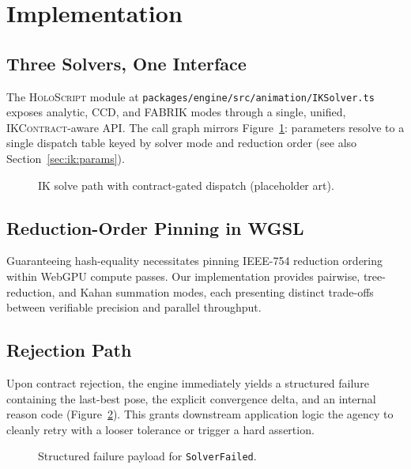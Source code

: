 \documentclass[sigconf,nonacm]{acmart}
\newcommand{\holoscript}{\textsc{HoloScript}}
\newcommand{\ikcontract}{\textsc{IKContract}}
\newcommand{\fabrik}{\textsc{FABRIK}}
\newcommand{\ccd}{\textsc{CCD}}
\begin{document}
\section{Implementation}
\label{sec:impl}

\subsection{Three Solvers, One Interface}
The \holoscript{} module at \texttt{packages/engine/src/animation/IKSolver.ts} exposes analytic, \ccd{}, and \fabrik{} modes through a single, unified, \ikcontract{}-aware API. The call graph mirrors
Figure~\ref{fig:ik-api}: parameters resolve to a single dispatch table keyed by
solver mode and reduction order (see also Section~\ref{sec:ik:params}).

\begin{figure}[t]
  \centering
  \caption{IK solve path with contract-gated dispatch (placeholder art).}
  \label{fig:ik-api}
\end{figure}

\subsection{Reduction-Order Pinning in WGSL}
Guaranteeing hash-equality necessitates pinning IEEE-754 reduction ordering within WebGPU compute passes. Our implementation provides pairwise, tree-reduction, and Kahan summation modes, each presenting distinct trade-offs between verifiable precision and parallel throughput.

\subsection{Rejection Path}
Upon contract rejection, the engine immediately yields a structured failure containing the last-best pose, the explicit convergence delta, and an internal reason code (Figure~\ref{fig:reject}). This grants downstream application logic the agency to cleanly retry with a looser tolerance or trigger a hard assertion.

\begin{figure}[t]
  \centering
  \caption{Structured failure payload for \texttt{SolverFailed}.}
  \label{fig:reject}
\end{figure}
\end{document}
